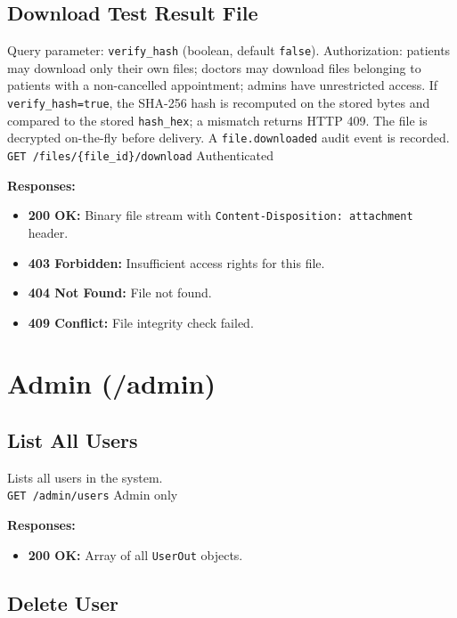\documentclass[a4paper,12pt]{report}
\begin{document}
\subsection{Download Test Result File}

Query parameter: \texttt{verify\_hash} (boolean, default \texttt{false}). Authorization: patients may download only their own files; doctors may download files belonging to patients with a non-cancelled appointment; admins have unrestricted access. If \texttt{verify\_hash=true}, the SHA-256 hash is recomputed on the stored bytes and compared to the stored \texttt{hash\_hex}; a mismatch returns HTTP 409. The file is decrypted on-the-fly before delivery. A \texttt{file.downloaded} audit event is recorded. \\
\texttt{GET /files/\{file\_id\}/download} \hfill Authenticated

\noindent\textbf{Responses:}
\begin{itemize}
    \item \textbf{200 OK:} Binary file stream with \texttt{Content-Disposition: attachment} header.
    \item \textbf{403 Forbidden:} Insufficient access rights for this file.
    \item \textbf{404 Not Found:} File not found.
    \item \textbf{409 Conflict:} File integrity check failed.
\end{itemize}

\section{Admin (/admin)}

\subsection{List All Users}

Lists all users in the system. \\
\texttt{GET /admin/users} \hfill Admin only

\noindent\textbf{Responses:}
\begin{itemize}
    \item \textbf{200 OK:} Array of all \texttt{UserOut} objects.
\end{itemize}

\subsection{Delete User}
\end{document}
